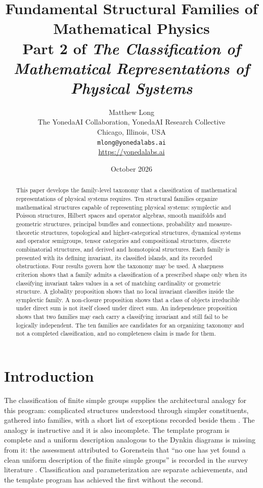 \documentclass[11pt,letterpaper]{article}
\title{Fundamental Structural Families of Mathematical Physics\\[4pt]
  {\normalsize Part 2 of \emph{The Classification of Mathematical Representations of Physical Systems}}}
\author{Matthew Long\\
  \small The YonedaAI Collaboration, YonedaAI Research Collective\\
  \small Chicago, Illinois, USA\\
  \small \texttt{mlong@yonedalabs.ai}\\
  \small \url{https://yonedalabs.ai}}
\date{October 2026}
\theoremstyle{definition}
\theoremstyle{remark}
\begin{document}
\maketitle

\begin{abstract}
This paper develops the family-level taxonomy that a classification of mathematical representations of physical systems requires. Ten structural families organize mathematical structures capable of representing physical systems: symplectic and Poisson structures, Hilbert spaces and operator algebras, smooth manifolds and geometric structures, principal bundles and connections, probability and measure-theoretic structures, topological and higher-categorical structures, dynamical systems and operator semigroups, tensor categories and compositional structures, discrete combinatorial structures, and derived and homotopical structures. Each family is presented with its defining invariant, its classified islands, and its recorded obstructions. Four results govern how the taxonomy may be used. A sharpness criterion shows that a family admits a classification of a prescribed shape only when its classifying invariant takes values in a set of matching cardinality or geometric structure. A globality proposition shows that no local invariant classifies inside the symplectic family. A non-closure proposition shows that a class of objects irreducible under direct sum is not itself closed under direct sum. An independence proposition shows that two families may each carry a classifying invariant and still fail to be logically independent. The ten families are candidates for an organizing taxonomy and not a completed classification, and no completeness claim is made for them.
\end{abstract}

\section{Introduction}

The classification of finite simple groups supplies the architectural analogy for this program: complicated structures understood through simpler constituents, gathered into families, with a short list of exceptions recorded beside them \cite{cfsg,solomon}. The analogy is instructive and it is also incomplete. The template program is complete and a uniform description analogous to the Dynkin diagrams is missing from it: the assessment attributed to Gorenstein that ``no one has yet found a clean uniform description of the finite simple groups'' is recorded in the survey literature \cite{cfsg,solomon}. Classification and parameterization are separate achievements, and the template program has achieved the first without the second.
\end{document}
